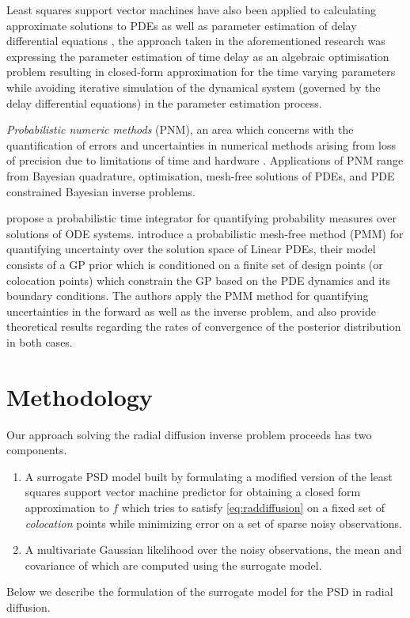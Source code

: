 Least squares support vector machines have also been applied to calculating approximate solutions 
to PDEs \citep{MEHRKANOON2015105,MEHRKANOON20122502} as well as parameter estimation of delay 
differential equations \citep{MEHRKANOON2014830}, the approach taken in the aforementioned research 
\citep{MEHRKANOON2014830} was expressing the parameter estimation of time delay as an algebraic 
optimisation problem resulting in closed-form approximation for the time varying parameters while 
avoiding iterative simulation of the dynamical system 
(governed by the delay differential equations) in the parameter estimation process.

\emph{Probabilistic numeric methods} (PNM), an area which concerns with the quantification of 
errors and uncertainties in numerical methods arising from loss of precision due to limitations of 
time and hardware \citep{hennig2015probabilistic}. Applications of PNM range from Bayesian 
quadrature, optimisation, mesh-free solutions of PDEs, and PDE constrained Bayesian inverse 
problems. 

\citet{conrad2017statistical} propose a probabilistic time integrator for quantifying probability 
measures over solutions of ODE systems. \citet{girolamiSullivanPDE} introduce a probabilistic 
mesh-free method (PMM) for quantifying uncertainty over the solution space of Linear PDEs, their 
model consists of a GP prior which is conditioned on a finite set of design points 
(or colocation points) which constrain the GP based on the PDE dynamics and its boundary 
conditions. The authors apply the PMM method for quantifying uncertainties in the forward as well 
as the inverse problem, and also provide theoretical results regarding the rates of convergence 
of the posterior distribution in both cases.

\section{Methodology}

Our approach solving the radial diffusion inverse problem proceeds has two components.
%
\begin{enumerate}
  \item A surrogate PSD model built by formulating a modified version of the 
        least squares support vector machine predictor for obtaining a closed form 
        approximation to $f$ which tries to satisfy \cref{eq:raddiffusion} on a fixed set of 
        \emph{colocation} points while minimizing error on a set of sparse noisy observations.
  \item A multivariate Gaussian likelihood over the noisy observations, the mean and covariance of 
        which are computed using the surrogate model.
\end{enumerate}
%
Below we describe the formulation of the surrogate model for the PSD in radial diffusion.

